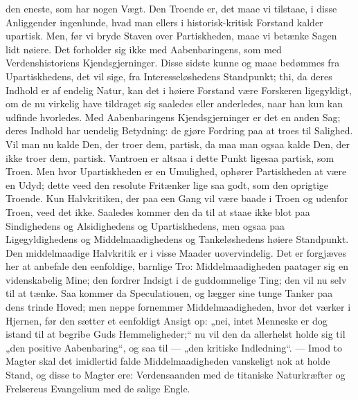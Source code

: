 \documentclass[12pt,a4paper]{book}
\begin{document}
den eneste, som har nogen Vægt. Den Troende er, det maae vi tilstaae, i disse
Anliggender ingenlunde, hvad man ellers i historisk-kritisk Forstand kalder upartisk.
Men, før vi bryde Staven over Partiskheden, maae vi betænke Sagen lidt nøiere. Det
forholder sig ikke med Aabenbaringens, som med Verdenshistoriens Kjendsgjerninger.
Disse sidste kunne og maae bedømmes fra Upartiskhedens, det vil sige, fra
Interesseløshedens Standpunkt; thi, da deres Indhold er af endelig Natur, kan det i
høiere Forstand være Forskeren ligegyldigt, om de nu virkelig have tildraget sig
saaledes eller anderledes, naar han kun kan udfinde hvorledes. Med Aabenbaringens
Kjendsgjerninger er det en anden Sag; deres Indhold har uendelig Betydning: de gjøre
Fordring paa at troes til Salighed. Vil man nu kalde Den, der troer dem, partisk, da
maa man ogsaa kalde Den, der ikke troer dem, partisk. Vantroen er altsaa i dette
Punkt ligesaa partisk, som Troen. Men hvor Upartiskheden er en Umulighed, ophører
Partiskheden at være en Udyd; dette veed den resolute Fritænker lige saa godt, som
den oprigtige Troende. Kun Halvkritiken, der paa een Gang vil være baade i Troen og
udenfor Troen, veed det ikke. Saaledes kommer den da til at staae ikke blot paa
Sindighedens og Alsidighedens og Upartiskhedens, men ogsaa paa Ligegyldighedens og
Middelmaadighedens og Tankeløshedens høiere Standpunkt. Den middelmaadige Halvkritik
er i visse Maader uovervindelig. Det er forgjæves her at anbefale den eenfoldige,
barnlige Tro: Middelmaadigheden paatager sig en videnskabelig Mine; den fordrer
Indsigt i de guddommelige Ting; den vil nu selv til at tænke. Saa kommer da
Speculatiouen, og lægger sine tunge Tanker paa dens trinde Hoved; men neppe fornemmer
Middelmaadigheden, hvor det værker
i Hjernen, før den sætter et eenfoldigt Ansigt op: „nei, intet Menneske er dog istand
til at begribe Guds Hemmeligheder;“ nu vil den da allerhelst holde sig til „den
positive Aabenbaring“, og saa til --- „den kritiske Indledning“. --- Imod to Magter
skal det imidlertid falde Middelmaadigheden vanskeligt nok at holde Stand, og disse
to Magter ere: Verdensaanden med de titaniske Naturkræfter og Frelsereus Evangelium
med de salige Engle.
\end{document}
